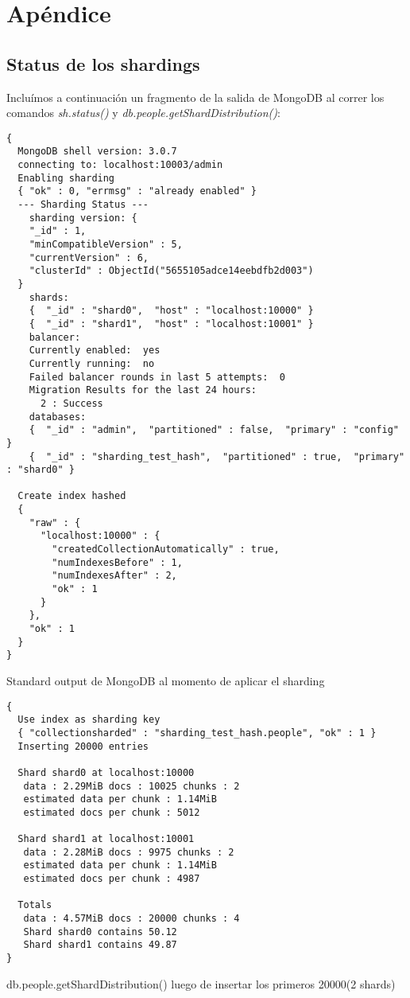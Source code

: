 \section{Apéndice}

\subsection{Status de los shardings}

Incluímos a continuación un fragmento de la salida de MongoDB al correr los comandos \emph{sh.status()}
y \emph{db.people.getShardDistribution()}:

\begin{listing}
\begin{verbatim}
{
  MongoDB shell version: 3.0.7
  connecting to: localhost:10003/admin
  Enabling sharding
  { "ok" : 0, "errmsg" : "already enabled" }
  --- Sharding Status ---
    sharding version: {
    "_id" : 1,
    "minCompatibleVersion" : 5,
    "currentVersion" : 6,
    "clusterId" : ObjectId("5655105adce14eebdfb2d003")
  }
    shards:
    {  "_id" : "shard0",  "host" : "localhost:10000" }
    {  "_id" : "shard1",  "host" : "localhost:10001" }
    balancer:
    Currently enabled:  yes
    Currently running:  no
    Failed balancer rounds in last 5 attempts:  0
    Migration Results for the last 24 hours:
      2 : Success
    databases:
    {  "_id" : "admin",  "partitioned" : false,  "primary" : "config" }
    {  "_id" : "sharding_test_hash",  "partitioned" : true,  "primary" : "shard0" }

  Create index hashed
  {
    "raw" : {
      "localhost:10000" : {
        "createdCollectionAutomatically" : true,
        "numIndexesBefore" : 1,
        "numIndexesAfter" : 2,
        "ok" : 1
      }
    },
    "ok" : 1
  }
}
\end{verbatim}
\caption{Standard output de MongoDB al momento de aplicar el sharding}
\label{json-example}
\end{listing}

\begin{listing}
\begin{verbatim}
{
  Use index as sharding key
  { "collectionsharded" : "sharding_test_hash.people", "ok" : 1 }
  Inserting 20000 entries

  Shard shard0 at localhost:10000
   data : 2.29MiB docs : 10025 chunks : 2
   estimated data per chunk : 1.14MiB
   estimated docs per chunk : 5012

  Shard shard1 at localhost:10001
   data : 2.28MiB docs : 9975 chunks : 2
   estimated data per chunk : 1.14MiB
   estimated docs per chunk : 4987

  Totals
   data : 4.57MiB docs : 20000 chunks : 4
   Shard shard0 contains 50.12
   Shard shard1 contains 49.87
}
\end{verbatim}
\caption{db.people.getShardDistribution() luego de insertar los primeros 20000(2 shards)}
\label{json-example}
\end{listing}


